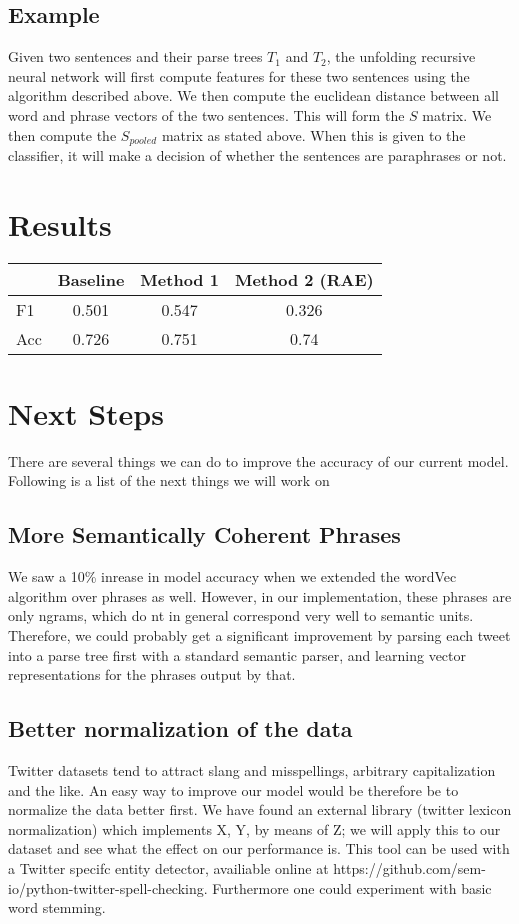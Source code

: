 \documentclass[conference]{IEEEtran}
\begin{document}
\subsection{Example}
Given two sentences and their parse trees $T_1$ and $T_2$, the unfolding recursive neural network will first compute features for these two sentences using the algorithm described above. We then compute the euclidean distance between all word and phrase vectors of the two sentences. This will form the $S$ matrix. We then compute the $S_{pooled}$ matrix as stated above. When this is given to the classifier, it will make a decision of whether the sentences are paraphrases or not.\\

\section{Results}
\begin{center}
\begin{tabular}{|l | c | c | c|}
\hline
 & Baseline & Method 1 & Method 2 (RAE) \\ \hline
 F1 & 0.501 & 0.547 & 0.326 \\ \hline
 Acc & 0.726 & 0.751 & 0.74 \\ 
 \hline
\end{tabular}
\end{center}


\section{Next Steps}
There are several things we can do to improve the accuracy of our current model.  Following is a list of the next things we will work on



\subsection{More Semantically Coherent Phrases}We saw a 10\% inrease in model accuracy when we extended the wordVec algorithm over phrases as well.  However, in our implementation, these phrases are only ngrams, which do nt in general correspond very well to semantic units.  Therefore, we could probably get a significant improvement by parsing each tweet into a parse tree first with a standard semantic parser, and learning vector representations for the phrases output by that.


\subsection{Better normalization of the data}
Twitter datasets tend to attract slang and misspellings, arbitrary capitalization and the like.  An easy way to improve our model would be therefore be to normalize the data better first.  We have found an external library (twitter lexicon normalization) which implements X, Y, by means of Z; we will apply this to our dataset and see what the effect on our performance is.  This tool can be used with a Twitter specifc entity detector, availiable online at https://github.com/sem-io/python-twitter-spell-checking. Furthermore one could experiment with basic word stemming.  
\end{document}
